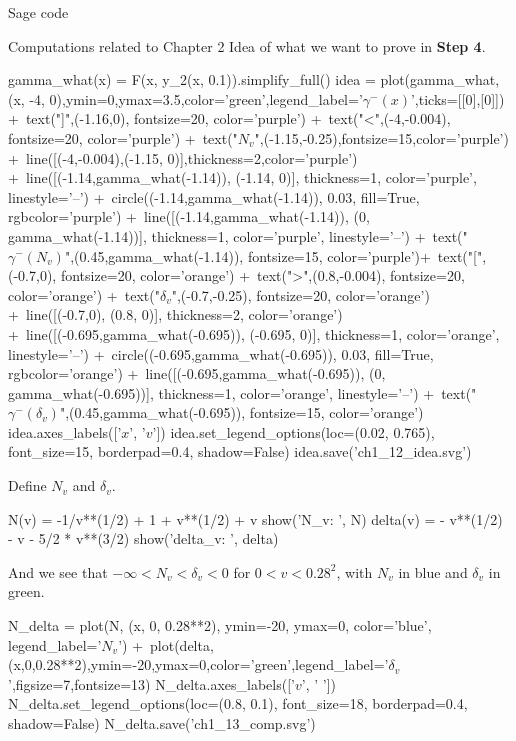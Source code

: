 \documentclass[11pt, a4paper, english, twoside, notitlepage, openright]{report}
\begin{document}
\begin{chapter}{Sage code}
\begin{section}{Computations related to Chapter 2}
Idea of what we want to prove in \textbf{Step 4}.
\begin{sage}
gamma_what(x) = F(x, y_2(x, 0.1)).simplify_full()
idea = plot(gamma_what, (x, -4, 0),ymin=0,ymax=3.5,color='green',legend_label='$\gamma^-(x)$',ticks=[[0],[0]]) +\
    text("]",(-1.16,0), fontsize=20, color='purple') +\
    text("<",(-4,-0.004), fontsize=20, color='purple') +\
    text("$N_v$",(-1.15,-0.25),fontsize=15,color='purple') +\
    line([(-4,-0.004),(-1.15, 0)],thickness=2,color='purple') +\
    line([(-1.14,gamma_what(-1.14)), (-1.14, 0)], thickness=1, color='purple', linestyle='--') +\
    circle((-1.14,gamma_what(-1.14)), 0.03, fill=True, rgbcolor='purple') +\
    line([(-1.14,gamma_what(-1.14)), (0, gamma_what(-1.14))], thickness=1, color='purple', linestyle='--') +\
    text("$\gamma^-(N_v)$",(0.45,gamma_what(-1.14)), fontsize=15, color='purple')+\
    text("[",(-0.7,0), fontsize=20, color='orange') +\
    text(">",(0.8,-0.004), fontsize=20, color='orange') +\
    text("$\delta_v$",(-0.7,-0.25), fontsize=20, color='orange') +\
    line([(-0.7,0), (0.8, 0)], thickness=2, color='orange') +\
    line([(-0.695,gamma_what(-0.695)), (-0.695, 0)], thickness=1, color='orange', linestyle='--') +\
    circle((-0.695,gamma_what(-0.695)), 0.03, fill=True, rgbcolor='orange') +\
    line([(-0.695,gamma_what(-0.695)), (0, gamma_what(-0.695))], thickness=1, color='orange', linestyle='--') +\
    text("$\gamma^-(\delta_v)$",(0.45,gamma_what(-0.695)), fontsize=15, color='orange')
idea.axes_labels(['$x$', '$v$'])
idea.set_legend_options(loc=(0.02, 0.765), font_size=15, borderpad=0.4, shadow=False)
idea.save('ch1_12_idea.svg')
\end{sage}

Define $N_v$ and $\delta_v$.
\begin{sage}
N(v) = -1/v**(1/2) + 1 + v**(1/2) + v
show('N_v: ', N)
delta(v) = - v**(1/2) - v - 5/2 * v**(3/2)
show('delta_v: ', delta)
\end{sage}

And we see that $-\infty < N_v < \delta_v < 0$  for $0 < v < 0.28^2$, with $N_v$ in blue and $\delta_v$ in green.
\begin{sage}
N_delta = plot(N, (x, 0, 0.28**2), ymin=-20, ymax=0, color='blue', legend_label='$N_v$') +\
    plot(delta,(x,0,0.28**2),ymin=-20,ymax=0,color='green',legend_label='$\delta_v$',figsize=7,fontsize=13)
N_delta.axes_labels(['$v$', ' '])
N_delta.set_legend_options(loc=(0.8, 0.1), font_size=18, borderpad=0.4, shadow=False)
N_delta.save('ch1_13_comp.svg')
\end{sage}


\end{section}
\end{chapter}
\end{document}
